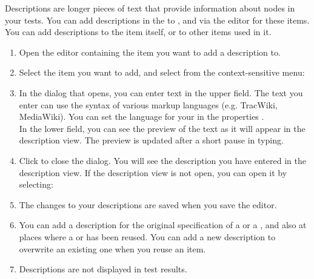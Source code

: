 Descriptions are longer pieces of text that provide information about nodes in your tests. You can add descriptions in the \ite{} to \gdcases{}, \gdsuites{} and \gdjobs{} via the editor for these items. You can add descriptions to the item itself, or to other items used in it. 


\begin{enumerate}
\item Open the editor containing the item you want to add a description to. 
\item Select the item you want to add, and select from the context-sensitive menu:\\
\item In the dialog that opens, you can enter text in the upper field. The text you enter can use the syntax of various markup languages (e.g. TracWiki, MediaWiki). You can set the language for your \gdproject{} in the \gdproject{} properties . \\
In the lower field, you can see the preview of the text as it will appear in the description view. The preview is updated after a short pause in typing.
\item Click  to close the dialog. You will see the description you have entered in the description view. If the description view is not open, you can open it by selecting:\\
\item The changes to your descriptions are saved when you save the editor.
\item You can add a description for the original specification of a \gdcase{} or a \gdsuite{}, and also at places where a \gdcase{} or \gdsuite{} has been reused. You can add a new description to overwrite an existing one when you reuse an item. 
\item Descriptions are not displayed in test results.
\end{enumerate}

